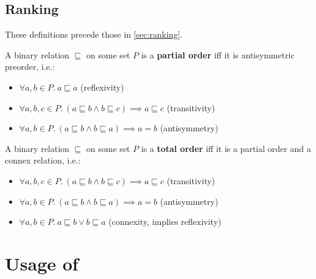 \section{Ranking}

These definitions precede those in \cref{sec:ranking}.

\begin{definition}
    A binary relation $\sqsubseteq$ on some set $P$ is a \textbf{partial order} iff it is antisymmetric preorder, i.e.:
    \begin{itemize}
        \item $\forall a, b \in P.\ a \sqsubseteq a$ \tabto{7.3cm}(reflexivity)
        \item $\forall a, b, c \in P.\ (a \sqsubseteq b \wedge b \sqsubseteq c) \implies a \sqsubseteq c$ \tabto{7.3cm}(transitivity)
        \item $\forall a, b \in P.\ (a \sqsubseteq b \wedge b \sqsubseteq a) \implies a = b$ \tabto{7.3cm}(antisymmetry)
    \end{itemize}
\end{definition}

\begin{definition}
    A binary relation $\sqsubseteq$ on some set $P$ is a \textbf{total order} iff it is a partial order and a connex relation, i.e.:
    \begin{itemize}
        \item $\forall a, b, c \in P.\ (a \sqsubseteq b \wedge b \sqsubseteq c) \implies a \sqsubseteq c$ \tabto{7.3cm}(transitivity)
        \item $\forall a, b \in P.\ (a \sqsubseteq b \wedge b \sqsubseteq a) \implies a = b$ \tabto{7.3cm}(antisymmetry)
        \item $\forall a, b \in P.\ a \sqsubseteq b \vee b \sqsubseteq a$ \tabto{7.3cm}(connexity, implies reflexivity)
    \end{itemize}
\end{definition}



\chapter{Usage of \graffs}


